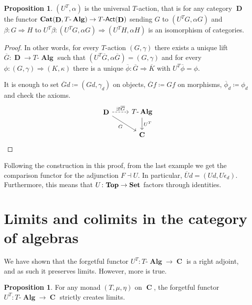 \documentclass[a4paper,11pt,fullpage,oneside,openany]{amsbook}
\newcommand{\catname}[1]{{\normalfont\textbf{#1}}}
\DeclareMathOperator{\Alg}{\mathbf{Alg}}
\newcommand{\Set}{\catname{Set}}
\newcommand{\Top}{\catname{Top}}
\newcommand{\Cat}{\catname{Cat}}
\DeclareMathOperator{\C}{\mathbf{C}}
\DeclareMathOperator{\D}{\mathbf{D}}
\theoremstyle{definition}
\theoremstyle{definition}
\newtheorem{prop}[thm]{Proposition}
\theoremstyle{remark}
\begin{document}
\begin{prop}
	$(U^T,\alpha)$ is the universal $T$-action, that is for any category $\D$ the functor $\Cat(\D,T\mbox{-}\Alg)\rightarrow T\mbox{-}\mathsf{Act}(\D)$ sending $G$ to $(U^TG,\alpha G)$ and $\beta\colon G\Rightarrow H$ to $U^T\beta\colon(U^TG,\alpha G)\Rightarrow (U^TH,\alpha H)$ is an isomorphism of categories.
\end{prop}

\begin{proof}
	In other words, for every $T$-action $(G,\gamma)$ there exists a unique lift $\overline{G}\colon\D\rightarrow T\mbox{-}\Alg$ such that $(U^T\overline{G},\alpha\overline{G})=(G,\gamma)$ and for every $\phi\colon(G,\gamma)\Rightarrow (K,\kappa)$ there is a unique $\overline{\phi}\colon\overline{G}\Rightarrow\overline{K}$ with $U^T\overline{\phi}=\phi$.
	
	It is enough to set $\overline{G}d\coloneqq(Gd,\gamma_d)$ on objects, $\overline{G}f\coloneqq Gf$ on morphisms, $\overline{\phi}_d\coloneqq\phi_d$ and check the axioms.
	\[
		\begin{tikzcd}
			\D\ar[r, dashed, "\exists!\overline{G}"]\ar[dr, swap, "G"]
			& T\mbox{-}\Alg\ar[d, "U^T"] \\
			& \C                  
		\end{tikzcd}    
	\]			
\end{proof}

Following the construction in this proof, from the last example we get the comparison functor for the adjunction $F\dashv U$. In particular, $\overline{U}d=(Ud,U\epsilon_d)$. Furthermore, this means that $U\colon\Top\rightarrow\Set$ factors through identities.


\section{Limits and colimits in the category of algebras}

We have shown that the forgetful functor $U^T\colon T\mbox{-}\Alg\rightarrow\C$ is a right adjoint, and as such it preserves limits. However, more is true.

\begin{prop}\label{create lims}
	For any monad $(T,\mu,\eta)$ on $\C$, the forgetful functor $U^T\colon T\mbox{-}\Alg\rightarrow\C$ strictly creates limits.
\end{prop}
\end{document}
